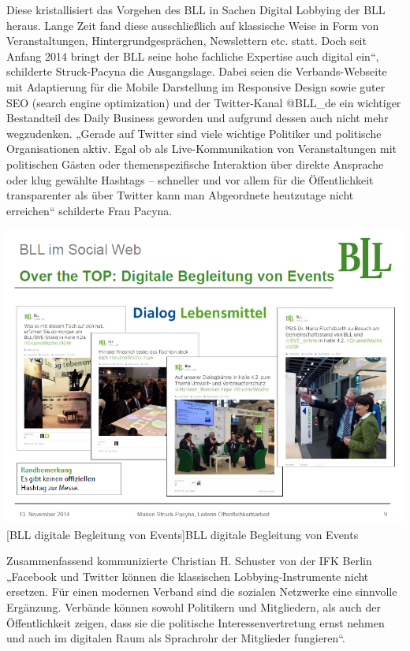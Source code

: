 \documentclass[12pt,a4paper,bibliography=totocnumbered,listof=totocnumbered]{scrartcl}
\begin{document}
Diese kristallisiert das Vorgehen des BLL in Sachen Digital Lobbying der BLL heraus. Lange Zeit fand diese ausschließlich auf klassische Weise in Form von Veranstaltungen, Hintergrundgesprächen, Newslettern etc. statt. Doch seit Anfang 2014 bringt der BLL seine hohe fachliche Expertise auch digital ein“, schilderte Struck-Pacyna die Ausgangslage. Dabei seien die Verbands-Webseite mit Adaptierung für die Mobile Darstellung im Responsive Design sowie guter SEO (search engine  optimization) und der Twitter-Kanal @BLL\_de ein wichtiger Bestandteil des Daily Business geworden und aufgrund dessen auch nicht mehr wegzudenken. „Gerade auf Twitter sind viele wichtige Politiker und politische Organisationen aktiv. Egal ob als Live-Kommunikation von Veranstaltungen mit politischen Gästen oder themenspezifische Interaktion über direkte Ansprache oder klug gewählte Hashtags – schneller und vor allem für die Öffentlichkeit transparenter als über Twitter kann man Abgeordnete heutzutage nicht erreichen“ schilderte Frau Pacyna. \cite[vgl.]{DPRG}

\vspace{1em}
\begin{minipage}{\linewidth}
	\centering
	\includegraphics[width=1\linewidth]{Bilder/bla2.png}
	[BLL digitale Begleitung von Events]{BLL digitale Begleitung von Events\footnotemark }
	\label{fig:osgi}
\end{minipage}

Zusammenfassend kommunizierte Christian H. Schuster von der IFK Berlin „Facebook und Twitter können die klassischen Lobbying-Instrumente nicht ersetzen. Für einen modernen Verband sind die sozialen Netzwerke eine sinnvolle Ergänzung. Verbände können sowohl Politikern und Mitgliedern, als auch der Öffentlichkeit zeigen, dass sie die politische Interessenvertretung ernst nehmen und auch im digitalen Raum als Sprachrohr der Mitglieder fungieren“. \cite[vgl.]{DPRG}
\end{document}
